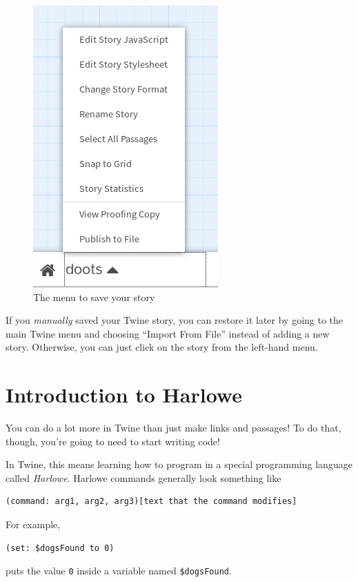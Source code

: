 \documentclass[a5paper,11pt]{article}
\begin{document}
  \begin{figure}[h]
    \caption{The menu to save your story}
    \includegraphics[width=0.6\linewidth]{SavingTwine}
    \centering
  \end{figure}
  
  If you \emph{manually} saved your Twine story, you can restore it later by going to the main Twine menu and choosing ``Import From File'' instead of adding a new story. Otherwise, you can just click on the story from the left-hand menu.

\clearpage

  \section{Introduction to Harlowe}
You can do a lot more in Twine than just make links and passages! To do that, though, you're going to need to start writing code!

In Twine, this means learning how to program in a special programming language called \emph{Harlowe}. Harlowe commands generally look something like
\begin{verbatim}
(command: arg1, arg2, arg3)[text that the command modifies]
\end{verbatim}

For example,
\begin{verbatim}
(set: $dogsFound to 0)
\end{verbatim}
puts the value \verb"0" inside a variable named \verb"$dogsFound".
\end{document}
